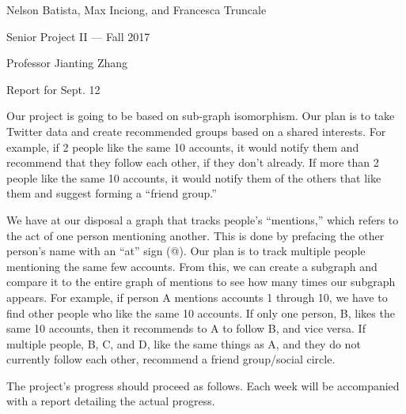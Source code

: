 \documentclass{article}
\begin{document}
\noindent Nelson Batista, Max Inciong, and Francesca Truncale

\noindent Senior Project II --- Fall 2017

\noindent Professor Jianting Zhang

\noindent Report for Sept. 12


Our project is going to be based on sub-graph isomorphism. Our plan is to take Twitter data and create recommended groups based on a shared interests. For example, if 2 people like the same 10 accounts, it would notify them and recommend that they follow each other, if they don't already. If more than 2 people like the same 10 accounts, it would notify them of the others that like them and suggest forming a ``friend group.''

We have at our disposal a graph that tracks people's ``mentions,'' which refers to the act of one person mentioning another. This is done by prefacing the other person's name with an ``at'' sign (@). Our plan is to track multiple people mentioning the same few accounts. From this, we can create a subgraph and compare it to the entire graph of mentions to see how many times our subgraph appears. For example, if person A mentions accounts 1 through 10, we have to find other people who like the same 10 accounts.
If only one person, B, likes the same 10 accounts, then it recommends to A to follow B, and vice versa. If multiple people, B, C, and D, like the same things as A, and they do not currently follow each other, recommend a friend group/social circle.

The project's progress should proceed as follows. Each week will be accompanied with a report detailing the actual progress.
\end{document}
